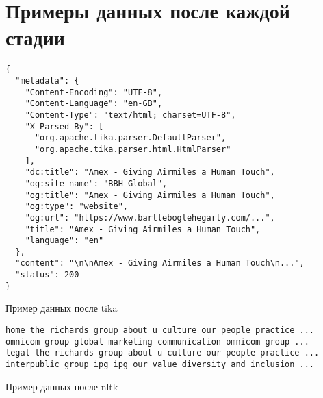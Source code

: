 
\appendix
\chapter{Примеры данных после каждой стадии}
\begin{listing}[!ht]
\begin{verbatim}
{
  "metadata": {
    "Content-Encoding": "UTF-8",
    "Content-Language": "en-GB",
    "Content-Type": "text/html; charset=UTF-8",
    "X-Parsed-By": [
      "org.apache.tika.parser.DefaultParser",
      "org.apache.tika.parser.html.HtmlParser"
    ],
    "dc:title": "Amex - Giving Airmiles a Human Touch",
    "og:site_name": "BBH Global",
    "og:title": "Amex - Giving Airmiles a Human Touch",
    "og:type": "website",
    "og:url": "https://www.bartleboglehegarty.com/...",
    "title": "Amex - Giving Airmiles a Human Touch",
    "language": "en"
  },
  "content": "\n\nAmex - Giving Airmiles a Human Touch\n...",
  "status": 200
}
\end{verbatim}
\caption{Пример данных после \gls{tika}}
\label{listing:tika-example}
\end{listing}

\begin{listing}[!ht]
\begin{verbatim}
home the richards group about u culture our people practice ...
omnicom group global marketing communication omnicom group ...
legal the richards group about u culture our people practice ...
interpublic group ipg ipg our value diversity and inclusion ... 
\end{verbatim}
\caption{Пример данных после \gls{nltk}}
\label{listing:tokenizer-example}
\end{listing}
